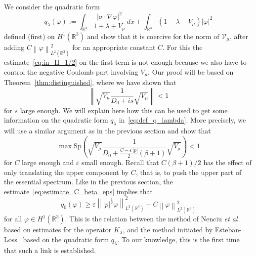 \documentclass[10pt]{amsart}
\theoremstyle{definition}
\newcommand{\R}{\mathbb{R}}
\newcommand{\cV}{\mathcal{V}}
\newcommand{\Spec}{\mathrm{Sp}}
\newcommand\1{{\ensuremath {\mathds 1} }}
\renewcommand\phi{\varphi}
\newcommand{\norm}[1]{ \left\| #1 \right\|}
\renewcommand{\geq}{\geqslant}
\newcommand{\eps}{\varepsilon}
\begin{document}
We consider the quadratic form
\begin{equation}\label{eq:def_q_lambda_bis}
q_\lambda(\phi):=\int_{\R^3}\frac{\left|\sigma\cdot\nabla\phi\right|^2}{1+\lambda+V_\mu}\,dx+\int_{\R^3}\left(1-\lambda-V_\mu\right)|\phi|^2
\end{equation}
defined (first) on $H^1(\R^3)$ and show that it is coercive for the norm of $\cV_\mu$, after adding $C\norm{\phi}_{L^2(\R^3)}^2$ for an appropriate constant $C$. For this the estimate~\eqref{eq:in_H_1/2} on the first term is not enough because we also have to control the negative Coulomb part involving $V_\mu$. Our proof will be based on Theorem~\ref{thm:distinguished}, where we have shown that
\begin{equation}\label{eq:estimate_i_s}
\norm{\sqrt{V_\mu}\frac1{D_0+is}\sqrt{V_\mu}}<1
\end{equation}
for $s$ large enough. We will explain here how this can be used to get some information on the quadratic form $q_\lambda$ in~\eqref{eq:def_q_lambda}. More precisely, we will use a similar argument as in the previous section and show that
\begin{equation}\label{eq:estimate_C_beta_eps}
\max\Spec\left(\sqrt{V_\mu}\frac1{D_0+\frac{C-\eps\,|p|}2 (\beta+1)}\sqrt{V_\mu}\right)<1
\end{equation}
for $C$ large enough and $\eps$ small enough. Recall that $C(\beta+1)/2$ has the effect of only translating the upper component by $C$, that is, to push the upper part of the essential spectrum. Like in the previous section, the estimate~\eqref{eq:estimate_C_beta_eps} implies that
\begin{equation}\label{eq:bound_q_0}
q_0(\phi)\geq\eps\norm{|p|^{\frac12}\phi}_{L^2\left(\R^3\right)}^2-C\norm{\phi}_{L^2\left(\R^3\right)}^2
\end{equation}
for all $\phi\in H^1(\R^3)$. This is the relation between the method of Nenciu \emph{et al}~\cite{Nenciu-76} based on estimates for the operator $K_\lambda$, and the method initiated by Esteban-Loss~\cite{EstLos-07,EstLos-08} based on the quadratic form $q_\lambda$. To our knowledge, this is the first time that such a link is established.


\end{document}
